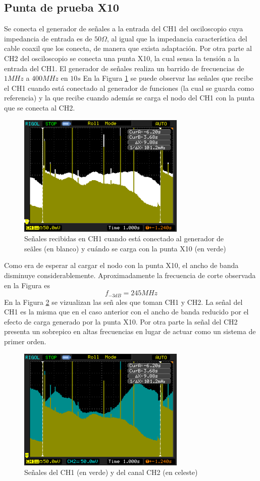 \documentclass[a4paper,10pt]{article}
\begin{document}
		\subsection{Punta de prueba X10}
		Se conecta el generador de se\~nales a la entrada del CH1 del osciloscopio cuya impedancia de entrada es de $50 \Omega$, al igual que la impedancia caracter\'istica del cable coaxil que los conecta, de manera que exista adaptaci\'on. Por otra parte al CH2 del osciloscopio se conecta una punta X10, la cual sensa la tensi\'on a la entrada del CH1.
		El generador de se\~nales realiza un barrido de frecuencias de $1MHz$ a $400MHz$ en $10s$
		En la Figura \ref{img001} se puede observar las se\~nales que recibe el CH1 cuando est\'a conectado al generador de funciones (la cual se guarda como referencia) y la que recibe cuando adem\'as se carga el nodo del CH1 con la punta que se conecta al CH2.
		\begin{figure}[!htb]
			\centering
			\includegraphics[width=8cm]{Imagenes/Mediciones instrumentos/NewFile1.png}
			\caption{Se\~nales recibidas en CH1 cuando est\'a conectado al generador de se\~ales (en blanco) y cu\'ando se carga con la punta X10 (en verde)} \label{img001}
		\end{figure}
			
		Como era de esperar al cargar el nodo con la punta X10, el ancho de banda disminuye considerablemente. Aproximadamente la frecuencia de corte observada en la Figura es $$f_{-3dB}=245MHz$$
		En la Figura \ref{img000} se vizualizan las se\~n ales que toman CH1 y CH2. La se\~nal del CH1 es la misma que en el caso anterior con el ancho de banda reducido por el efecto de carga generado por la punta X10. Por otra parte la se\~nal del CH2 presenta un sobrepico en altas frecuencias en lugar de actuar como un sistema de primer orden.
		\begin{figure}[!htb]
			\centering
			\includegraphics[width=8cm]{Imagenes/Mediciones instrumentos/NewFile0.png}
			\caption{Se\~nales del CH1 (en verde) y del canal CH2 (en celeste)} \label{img000}
		\end{figure}
									
\end{document}

